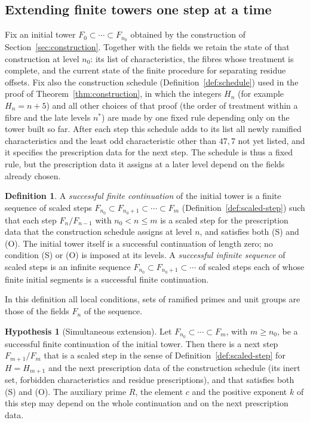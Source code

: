 \documentclass[11pt]{article}
\theoremstyle{plain}
\theoremstyle{definition}
\newtheorem{definition}[theorem]{Definition}
\newtheorem{hypothesis}[theorem]{Hypothesis}
\theoremstyle{remark}
\begin{document}
\subsection{Extending finite towers one step at a time}
\label{sec:selection-hypothesis}
Fix an initial tower $F_0\subset\cdots\subset F_{n_0}$ obtained by the
construction of Section~\ref{sec:construction}.  Together with the fields
we retain the state of that construction at level $n_0$: its list of
characteristics, the fibres whose treatment is complete, and the current
state of the finite procedure for separating residue offsets.  Fix also
the construction schedule (Definition~\ref{def:schedule}) used in the
proof of Theorem~\ref{thm:construction}, in which the integers $H_n$
(for example $H_n=n+5$) and all other choices of that proof (the order of
treatment within a fibre and the late levels $n^*$) are made by one fixed
rule depending only on the tower built so far.  After each step this schedule
adds to its list all newly ramified characteristics and the least odd
characteristic other than $47,7$ not yet listed, and it specifies the prescription data for
the next step.  The schedule is thus a fixed rule, but the prescription
data it assigns at a later level depend on the fields already chosen.

\begin{definition}\label{def:successful-continuation}
A \emph{successful finite continuation} of the initial tower is a finite
sequence of scaled steps $F_{n_0}\subset F_{n_0+1}\subset\cdots\subset
F_m$ (Definition~\ref{def:scaled-step}) such that each step
$F_n/F_{n-1}$ with $n_0<n\le m$ is a scaled step for the prescription
data that the construction schedule assigns at level $n$, and satisfies both
(S) and (O).  The initial tower itself is a successful continuation of
length zero; no condition (S) or (O) is imposed at its levels.  A
\emph{successful infinite sequence} of scaled steps is an infinite
sequence $F_{n_0}\subset F_{n_0+1}\subset\cdots$ of scaled steps each of
whose finite initial segments is a successful finite continuation.
\end{definition}

In this definition all local conditions, sets of ramified primes and
unit groups are those of the fields $F_n$ of the sequence.

\begin{hypothesis}[Simultaneous extension]\label{hyp:selection}
Let $F_{n_0}\subset\cdots\subset F_m$, with $m\ge n_0$, be a successful
finite continuation of the initial tower.  Then there is a next step
$F_{m+1}/F_m$ that is a scaled step in the sense of
Definition~\ref{def:scaled-step} for $H=H_{m+1}$ and the next
prescription data of the construction schedule (its inert set, forbidden
characteristics and residue prescriptions), and that satisfies both (S)
and (O).  The auxiliary
prime $R$, the element $c$ and the positive exponent $k$ of this step may
depend on the whole continuation and on the next prescription data.
\end{hypothesis}
\end{document}
